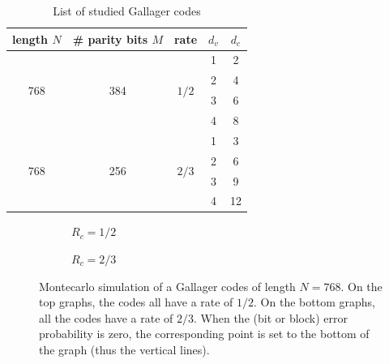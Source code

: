 \begin{table}
    \centering
    \begin{tabular}{c c c c c}
        length $N$           & \# parity bits $M$   & rate                   & $d_v$ & $d_c$ \\
        \hline \hline
        \multirow{4}{*}{768} & \multirow{4}{*}{384} & \multirow{4}{*}{$1/2$} & 1     & 2     \\
                             &                      &                        & 2     & 4     \\
                             &                      &                        & 3     & 6     \\
                             &                      &                        & 4     & 8     \\
        \hline
        \multirow{4}{*}{768} & \multirow{4}{*}{256} & \multirow{4}{*}{$2/3$} & 1     & 3     \\
                             &                      &                        & 2     & 6     \\
                             &                      &                        & 3     & 9     \\
                             &                      &                        & 4     & 12    \\
    \end{tabular}
    \caption{List of studied Gallager codes}
    \label{tab:gallager_codes}
\end{table}


\begin{figure}
    \centering

    \begin{subfigure}{\textwidth}
        \centering
        
        \caption{$R_c = 1/2$}
    \end{subfigure}%

    \begin{subfigure}{\textwidth}
        \centering
        
        \caption{$R_c = 2/3$}
    \end{subfigure}%
    \caption{%
        Montecarlo simulation of a Gallager codes of length $N = 768$. On the
        top graphs, the codes all have a rate of $1/2$. On the bottom graphs,
        all the codes have a rate of $2/3$. When the (bit or block) error
        probability is zero, the corresponding point is set to the bottom of the
        graph (thus the vertical lines).%
    }
    \label{fig:gallager_bmc}
\end{figure}

